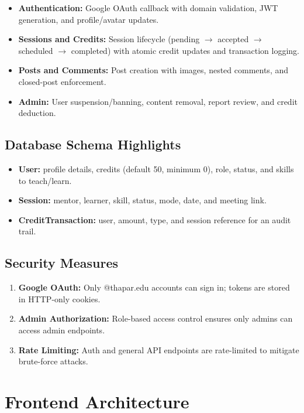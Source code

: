 \documentclass{tietreport}
\begin{document}
\begin{itemize}
  \item \textbf{Authentication:} Google OAuth callback with domain validation, JWT generation, and profile/avatar updates.
  \item \textbf{Sessions and Credits:} Session lifecycle (pending $\rightarrow$ accepted $\rightarrow$ scheduled $\rightarrow$ completed) with atomic credit updates and transaction logging.
  \item \textbf{Posts and Comments:} Post creation with images, nested comments, and closed-post enforcement.
  \item \textbf{Admin:} User suspension/banning, content removal, report review, and credit deduction.
\end{itemize}

\subsection{Database Schema Highlights}

\begin{itemize}
  \item \textbf{User:} profile details, credits (default 50, minimum 0), role, status, and skills to teach/learn.
  \item \textbf{Session:} mentor, learner, skill, status, mode, date, and meeting link.
  \item \textbf{CreditTransaction:} user, amount, type, and session reference for an audit trail.
\end{itemize}

\subsection{Security Measures}

\begin{enumerate}
  \item \textbf{Google OAuth:} Only @thapar.edu accounts can sign in; tokens are stored in HTTP-only cookies.
  \item \textbf{Admin Authorization:} Role-based access control ensures only admins can access admin endpoints.
  \item \textbf{Rate Limiting:} Auth and general API endpoints are rate-limited to mitigate brute-force attacks.
\end{enumerate}

\section{Frontend Architecture}
\end{document}
